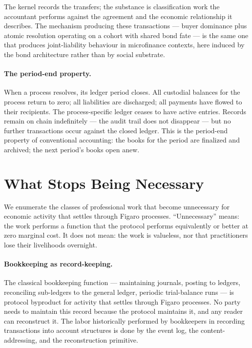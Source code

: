 \documentclass[11pt,a4paper]{article}
\theoremstyle{definition}
\theoremstyle{remark}
\begin{document}
The kernel records the transfers; the substance is
classification work the accountant performs against the
agreement and the economic relationship it describes. The
mechanism producing these transactions --- buyer dominance
plus atomic resolution operating on a cohort with shared bond
fate --- is the same one that produces joint-liability
behaviour in microfinance contexts, here induced by the bond
architecture rather than by social substrate.

\paragraph{The period-end property.}
When a process resolves, its ledger period closes. All
custodial balances for the process return to zero; all
liabilities are discharged; all payments have flowed to their
recipients. The process-specific ledger ceases to have active
entries. Records remain on chain indefinitely --- the audit
trail does not disappear --- but no further transactions
occur against the closed ledger. This is the period-end
property of conventional accounting: the books for the period
are finalized and archived; the next period's books open
anew.

\section{What Stops Being Necessary}
\label{sec:stops}

We enumerate the classes of professional work that become
unnecessary for economic activity that settles through
Figaro processes. ``Unnecessary'' means: the work performs a
function that the protocol performs equivalently or better at
zero marginal cost. It does not mean: the work is valueless,
nor that practitioners lose their livelihoods overnight.

\paragraph{Bookkeeping as record-keeping.}
The classical bookkeeping function --- maintaining journals,
posting to ledgers, reconciling sub-ledgers to the general
ledger, periodic trial-balance runs --- is protocol byproduct
for activity that settles through Figaro processes. No party
needs to maintain this record because the protocol maintains
it, and any reader can reconstruct it. The labor historically
performed by bookkeepers in recording transactions into
account structures is done by the event log, the
content-addressing, and the reconstruction primitive.
\end{document}
